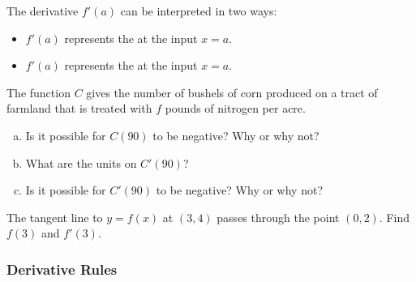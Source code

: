 \documentclass[notes]{subfiles}
\begin{document}
		\begin{rmk}
			The derivative $f'(a)$ can be interpreted in two ways:\\[10pt]
			\begin{itemize}
			\setlength\itemsep{15pt}
			
			\item $f'(a)$ represents the  at the input $x = a$.
			\item $f'(a)$ represents the  at the input $x = a$.
			\end{itemize}
		\end{rmk}
		\begin{ex}
			The function $C$ gives the number of bushels of corn produced on a tract of farmland that is treated with $f$ pounds of nitrogen per acre.
			\begin{enumerate}[(a)]
				\item Is it possible for $C(90)$ to be negative?  Why or why not?
					
				\item What are the units on $C'(90)$?

				\item Is it possible for $C'(90)$ to be negative?  Why or why not?
			\end{enumerate}
		\end{ex}
		
		\begin{ex}
			The tangent line to $y = f(x)$ at $(3,4)$ passes through the point $(0,2)$.  Find $f(3)$ and $f'(3)$.
		\end{ex}
			\newpage
			
	\subsubsection*{Derivative Rules}
			
\end{document}
